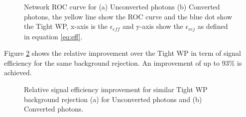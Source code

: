 \begin{figure}[htbp]
    \centering
    \caption{Network ROC curve for (a) Unconverted photons (b) Converted photons, the yellow line show the ROC curve and the blue dot show the Tight WP, x-axis is the $\epsilon_{eff}$ and y-axis show the $\epsilon_{rej}$ as defined in equation \ref{eq:eff}.}
    \label{fig:gamma:CNN:Validation:ROC}
\end{figure}
Figure \ref{fig:gamma:CNN:Validation:Imp} shows the relative improvement over the Tight WP in term of signal efficiency for the same background rejection. An improvement of up to 93\% is achieved. 
\begin{figure}[htbp]
    \centering
    \caption{Relative signal efficiency improvement for similar Tight WP background rejection (a) for Unconverted photons and (b) Converted photons.}
    \label{fig:gamma:CNN:Validation:Imp}
\end{figure}
